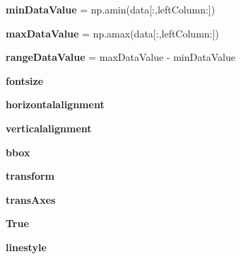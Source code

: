 \begin{DoxyCompactItemize}
\item 
\mbox{\label{class_f_plots_1_1_frm_plots_a2c9c88fc14aac912fba0acd883e88139}} 
{\bfseries min\+Data\+Value} = np.\+amin(data\mbox{[}\+:,left\+Column\+:\mbox{]})
\item 
\mbox{\label{class_f_plots_1_1_frm_plots_a6624b909d0940cb3d4e928456f3f93dc}} 
{\bfseries max\+Data\+Value} = np.\+amax(data\mbox{[}\+:,left\+Column\+:\mbox{]})
\item 
\mbox{\label{class_f_plots_1_1_frm_plots_a402d0dd3016d5be741d9a89cc8bba104}} 
{\bfseries range\+Data\+Value} = max\+Data\+Value -\/ min\+Data\+Value
\item 
\mbox{\label{class_f_plots_1_1_frm_plots_a250a5d2f03fc812bbbbe6311276875f5}} 
{\bfseries fontsize}
\item 
\mbox{\label{class_f_plots_1_1_frm_plots_a5d8a97bec5f2a4e66b0a271775cb04eb}} 
{\bfseries horizontalalignment}
\item 
\mbox{\label{class_f_plots_1_1_frm_plots_a6932276cbd368501997c05dd696f400e}} 
{\bfseries verticalalignment}
\item 
\mbox{\label{class_f_plots_1_1_frm_plots_ac0f879659935d910e7650d8e8c3de9a1}} 
{\bfseries bbox}
\item 
\mbox{\label{class_f_plots_1_1_frm_plots_ab3d350d501d99e7bbe8f68ace7af32c7}} 
{\bfseries transform}
\item 
\mbox{\label{class_f_plots_1_1_frm_plots_a34b6903eee181942a2b6097ce07a2d4f}} 
{\bfseries trans\+Axes}
\item 
\mbox{\label{class_f_plots_1_1_frm_plots_a643a20c0c59588a0f741a6095e2025fd}} 
{\bfseries True}
\item 
\mbox{\label{class_f_plots_1_1_frm_plots_ab9bc039d738431f72eb1cd461f3a1a32}} 
{\bfseries linestyle}

\end{DoxyCompactItemize}
